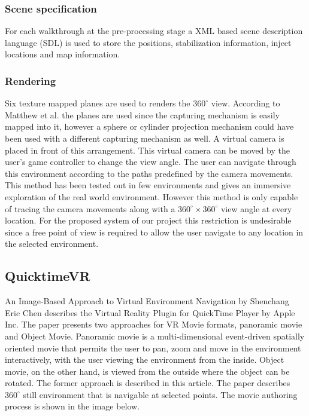 \subsubsection{Scene specification}
For each walkthrough at the pre-processing stage a XML based scene description language (SDL) is used to store the positions, stabilization information, inject locations and map information.

\subsubsection{Rendering}
Six texture mapped planes are used to renders the $360^{\circ}$ view. According to Matthew et al. the planes are used since the capturing mechanism is easily mapped into it, however a sphere or cylinder projection mechanism could have been used with a different capturing mechanism as well. A virtual camera is placed in front of this arrangement. This virtual camera can be moved by the user’s game controller to change the view angle. 
The user can navigate through this environment according to the paths predefined by the camera movements. 
This method has been tested out in few environments and gives an immersive exploration of the real world environment. However this method is only capable of tracing the camera movements along with a $360^{\circ}\times360^{\circ}$ view angle at every location. For the proposed system of our project this restriction is undesirable since a free point of view is required to allow the user navigate to any location in the selected environment.

\subsection{QuicktimeVR}
An Image-Based Approach to Virtual Environment Navigation by Shenchang Eric Chen describes the Virtual Reality Plugin for QuickTime Player by Apple Inc. \citep{Quicktime}
The paper presents two approaches for VR Movie formats, panoramic movie and Object Movie. Panoramic movie is a multi-dimensional event-driven spatially oriented movie that permits the user to pan, zoom and move in the environment interactively, with the user viewing the environment from the inside.  Object movie, on the other hand, is viewed from the outside where the object can be rotated. The former approach is described in this article.
The paper describes $360^{\circ}$ still environment that is navigable at selected points. The movie authoring process is shown in the image below.

